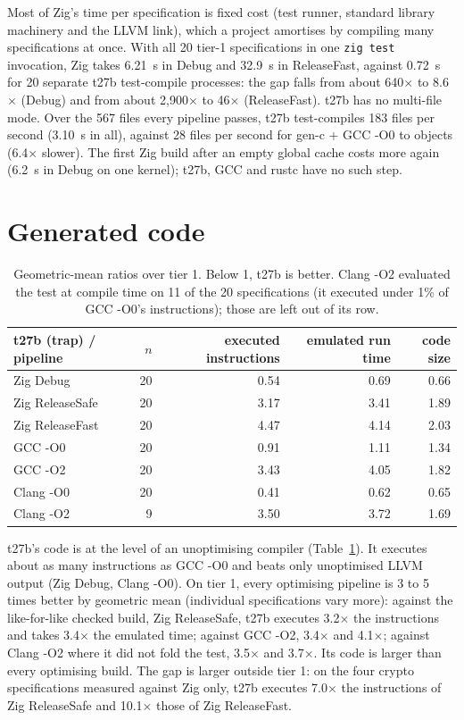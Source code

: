 \documentclass[11pt,a4paper]{article}
\begin{document}
Most of Zig's time per specification is fixed cost (test runner, standard
library machinery and the LLVM link), which a project amortises by
compiling many specifications at once. With all 20 tier-1 specifications
in one \texttt{zig test} invocation, Zig takes 6.21~s in Debug and 32.9~s
in ReleaseFast, against 0.72~s for 20 separate t27b test-compile
processes: the gap falls from about 640$\times$ to 8.6$\times$ (Debug) and
from about 2,900$\times$ to 46$\times$ (ReleaseFast). t27b has no
multi-file mode. Over the 567 files every pipeline passes, t27b
test-compiles 183 files per second (3.10~s in all), against 28 files per
second for gen-c + GCC -O0 to objects (6.4$\times$ slower). The first Zig
build after an empty global cache costs more again (6.2~s in Debug on one
kernel); t27b, GCC and rustc have no such step.

\section{Generated code}
\label{sec:code}

\begin{table}[h]
\centering
\small
\begin{tabular}{@{}lrrrr@{}}
\toprule
t27b (trap) / pipeline & $n$ & executed instructions & emulated run time & code size \\
\midrule
Zig Debug & 20 & 0.54 & 0.69 & 0.66 \\
Zig ReleaseSafe & 20 & 3.17 & 3.41 & 1.89 \\
Zig ReleaseFast & 20 & 4.47 & 4.14 & 2.03 \\
GCC -O0 & 20 & 0.91 & 1.11 & 1.34 \\
GCC -O2 & 20 & 3.43 & 4.05 & 1.82 \\
Clang -O0 & 20 & 0.41 & 0.62 & 0.65 \\
Clang -O2 & 9 & 3.50 & 3.72 & 1.69 \\
\bottomrule
\end{tabular}
\caption{Geometric-mean ratios over tier 1. Below 1, t27b is better.
Clang -O2 evaluated the test at compile time on 11 of the 20
specifications (it executed under 1\% of GCC -O0's instructions); those
are left out of its row.}
\label{tab:code}
\end{table}

t27b's code is at the level of an unoptimising compiler
(Table~\ref{tab:code}). It executes about as many instructions as GCC -O0
and beats only unoptimised LLVM output (Zig Debug, Clang -O0). On tier 1,
every optimising pipeline is 3 to 5 times better by geometric mean
(individual specifications vary more): against the like-for-like
checked build, Zig ReleaseSafe, t27b executes 3.2$\times$ the instructions
and takes 3.4$\times$ the emulated time; against GCC -O2, 3.4$\times$ and
4.1$\times$; against Clang -O2 where it did not fold the test,
3.5$\times$ and 3.7$\times$. Its code is larger than every optimising
build. The gap is larger outside tier 1: on the four crypto
specifications measured against Zig only, t27b executes 7.0$\times$ the
instructions of Zig ReleaseSafe and 10.1$\times$ those of Zig ReleaseFast.
\end{document}

